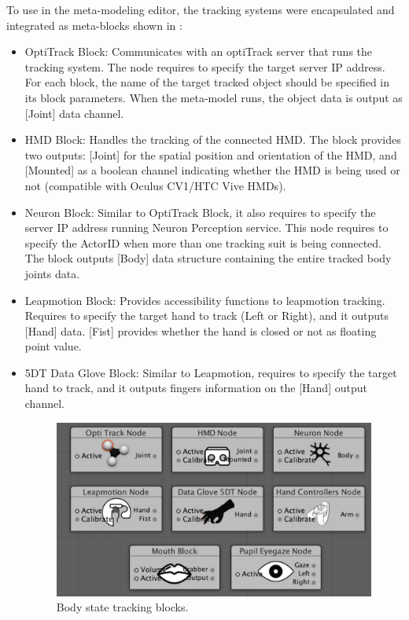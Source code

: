 To use in the meta-modeling editor, the tracking systems were encapsulated and integrated as meta-blocks shown in :
\begin{itemize}
\item OptiTrack Block: Communicates with an optiTrack server that runs the tracking system. The node requires to specify the target server IP address. For each block, the name of the target tracked object should be specified in its block parameters. When the meta-model runs, the object data is output as [Joint] data channel.

\item HMD Block: Handles the tracking of the connected HMD. The block provides two outputs: [Joint] for the spatial position and orientation of the HMD, and [Mounted] as a boolean channel indicating whether the HMD is being used or not (compatible with Oculus CV1/HTC Vive HMDs).

\item Neuron Block: Similar to OptiTrack Block, it also requires to specify the server IP address running Neuron Perception service. This node requires to specify the ActorID when more than one tracking suit is being connected. The block outputs [Body] data structure containing the entire tracked body joints data.

\item Leapmotion Block: Provides accessibility functions to leapmotion tracking. Requires to specify the target hand to track (Left or Right), and it outputs [Hand] data. [Fist] provides whether the hand is closed or not as floating point value.

\item 5DT Data Glove Block: Similar to Leapmotion, requires to specify the target hand to track, and it outputs fingers information on the [Hand] output channel.


\begin{figure}[t!]
\centering
\captionsetup{justification=centering} 
\includegraphics[width=1\textwidth]{figures/system/Blocks/Trackers.pdf}
\caption{Body state tracking blocks.}
  \label{fig:system-trackers-blocks}
\end{figure}


\end{itemize}
